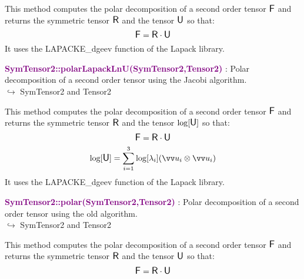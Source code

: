 This method computes the polar decomposition of a second order tensor $\mbox{\large\ensuremath{\mathsf{F}}}$ and returns the symmetric tensor $\mbox{\large\ensuremath{\mathsf{R}}}$ and the tensor $\mbox{\large\ensuremath{\mathsf{U}}}$ so that:
\begin{equation*}
\mbox{\large\ensuremath{\mathsf{F}}} = \mbox{\large\ensuremath{\mathsf{R}}} \cdot \mbox{\large\ensuremath{\mathsf{U}}}
\end{equation*}
It uses the LAPACKE\_dgeev function of the Lapack library.

\textcolor{purple}{\textbf{SymTensor2::polarLapackLnU(SymTensor2,Tensor2)}}\label{SymTensor2::polarLapackLnU(SymTensor2,Tensor2)} : Polar decomposition of a second order tensor using the Jacobi algorithm.\\ \hspace*{5mm}$\hookrightarrow$ SymTensor2 and Tensor2

This method computes the polar decomposition of a second order tensor $\mbox{\large\ensuremath{\mathsf{F}}}$ and returns the symmetric tensor $\mbox{\large\ensuremath{\mathsf{R}}}$ and the tensor $\log[\mbox{\large\ensuremath{\mathsf{U}}}]$ so that:
\begin{equation*}
\mbox{\large\ensuremath{\mathsf{F}}} = \mbox{\large\ensuremath{\mathsf{R}}} \cdot \mbox{\large\ensuremath{\mathsf{U}}}
\end{equation*}
\begin{equation*}
\log [\U] =\sum _{i=1}^{3}\log[\lambda_{i}](\overrightarrow{u}_{i}\otimes \overrightarrow{u}_{i})
\end{equation*}
It uses the LAPACKE\_dgeev function of the Lapack library.

\textcolor{purple}{\textbf{SymTensor2::polar(SymTensor2,Tensor2)}}\label{SymTensor2::polar(SymTensor2,Tensor2)} : Polar decomposition of a second order tensor using the old \DynELA algorithm.\\ \hspace*{5mm}$\hookrightarrow$ SymTensor2 and Tensor2

This method computes the polar decomposition of a second order tensor $\mbox{\large\ensuremath{\mathsf{F}}}$ and returns the symmetric tensor $\mbox{\large\ensuremath{\mathsf{R}}}$ and the tensor $\mbox{\large\ensuremath{\mathsf{U}}}$ so that:
\begin{equation*}
\mbox{\large\ensuremath{\mathsf{F}}} = \mbox{\large\ensuremath{\mathsf{R}}} \cdot \mbox{\large\ensuremath{\mathsf{U}}}
\end{equation*}


